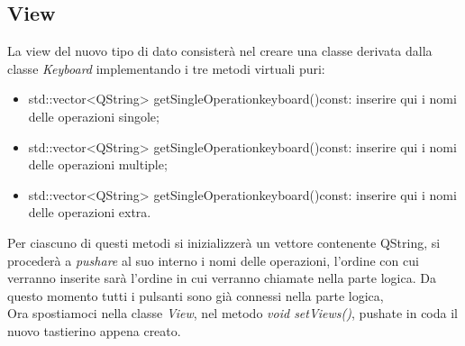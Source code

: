 \documentclass[a4paper,10pt]{article}
\begin{document}
            \subsection{View}
            La view del nuovo tipo di dato consisterà nel creare una classe derivata dalla classe \textit{Keyboard} implementando i tre metodi virtuali puri:
            \begin{itemize}
                \item std::vector<QString> getSingleOperationkeyboard()const: inserire qui i nomi delle operazioni singole;
                \item std::vector<QString> getSingleOperationkeyboard()const: inserire qui i nomi delle operazioni multiple;
                \item std::vector<QString> getSingleOperationkeyboard()const: inserire qui i nomi delle operazioni extra.
            \end{itemize}
            Per ciascuno di questi metodi si inizializzerà un vettore contenente QString, si procederà a \textit{pushare} al suo interno i nomi delle operazioni, l'ordine con cui verranno inserite sarà l'ordine in cui verranno chiamate nella parte logica. Da questo momento tutti i pulsanti sono già connessi nella parte logica, \\
            Ora spostiamoci nella classe \textit{View}, nel metodo \textit{void setViews()}, pushate in coda il nuovo tastierino appena creato.
\end{document}
